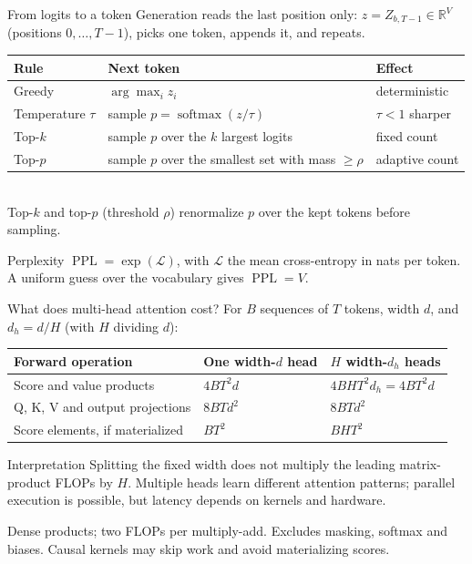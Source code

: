 \documentclass[handout]{beamer}
\begin{document}
\begin{frame}{From logits to a token}
  Generation reads the last position only: $z = Z_{b,T-1} \in \mathbb{R}^{V}$ (positions $0,\dots,T-1$), picks one token, appends it, and repeats.
  \begin{center}
    \footnotesize
    \renewcommand{\arraystretch}{1.25}
    \begin{tabular}{@{}lll@{}}
      \toprule
      \textbf{Rule} & \textbf{Next token} & \textbf{Effect} \\
      \midrule
      Greedy & $\arg\max_i z_i$ & deterministic \\
      Temperature $\tau$ & sample $p=\operatorname{softmax}(z/\tau)$ & $\tau<1$ sharper \\
      Top-$k$ & sample $p$ over the $k$ largest logits & fixed count \\
      Top-$p$ & sample $p$ over the smallest set with mass $\ge\rho$ & adaptive count \\
      \bottomrule
    \end{tabular}\\[3pt]
    {\footnotesize Top-$k$ and top-$p$ (threshold $\rho$) renormalize $p$ over the kept tokens before sampling.}
  \end{center}
  \begin{block}{Perplexity}
    $\operatorname{PPL}=\exp(\mathcal{L})$, with $\mathcal{L}$ the mean cross-entropy in nats per token. A uniform guess over the vocabulary gives $\operatorname{PPL}=V$.
  \end{block}
\end{frame}

\begin{frame}{What does multi-head attention cost?}
  \small
  For $B$ sequences of $T$ tokens, width $d$, and $d_h=d/H$ (with $H$ dividing $d$):
  \begin{center}
    \begin{tabular}{@{}lll@{}}
      \toprule
      Forward operation & One width-$d$ head & $H$ width-$d_h$ heads \\
      \midrule
      Score and value products & $4BT^2d$ & $4BHT^2d_h=4BT^2d$ \\
      Q, K, V and output projections & $8BTd^2$ & $8BTd^2$ \\
      Score elements, if materialized & $BT^2$ & $BHT^2$ \\
      \bottomrule
    \end{tabular}
  \end{center}
  \begin{block}{Interpretation}
    Splitting the fixed width does not multiply the leading matrix-product FLOPs by $H$. Multiple heads learn different attention patterns; parallel execution is possible, but latency depends on kernels and hardware.
  \end{block}
  {\scriptsize Dense products; two FLOPs per multiply-add. Excludes masking, softmax and biases. Causal kernels may skip work and avoid materializing scores.}
\end{frame}
\end{document}
